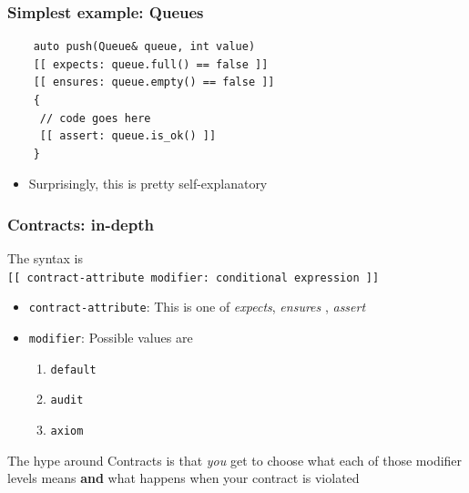 \documentclass{beamer}
\begin{document}
\begin{frame}[fragile]
\frametitle{Simplest example: Queues}

\begin{lstlisting}
    auto push(Queue& queue, int value)
    [[ expects: queue.full() == false ]]
    [[ ensures: queue.empty() == false ]]
    {
     // code goes here
     [[ assert: queue.is_ok() ]]
    }
\end{lstlisting}

\begin{itemize}
\item Surprisingly, this is pretty self-explanatory
\end{itemize}

\end{frame}

\begin{frame}
\frametitle{Contracts: in-depth}
The syntax  is \\ \texttt{[[ contract-attribute modifier: conditional expression ]]}

\begin{itemize}
\setlength\itemsep{2em}
\item \texttt{contract-attribute}:  This is one of \textit{expects}, \textit{ensures} , \textit{assert}
\item \texttt{modifier}: Possible values are 
\begin{enumerate}
\item \texttt{default}
\item \texttt{audit}
\item \texttt{axiom}
\end{enumerate}

\end{itemize}
\vspace{2em}
The hype around Contracts is that \emph{you} get to choose what each of those modifier levels means \textbf{and} what happens when your contract is violated

\end{frame}
\end{document}
